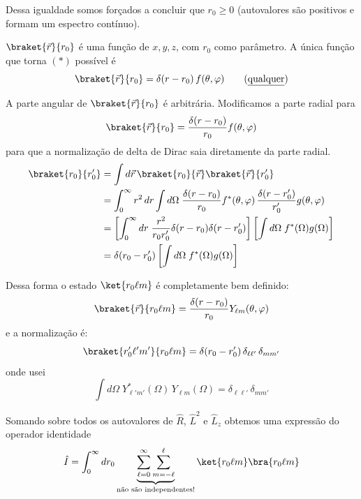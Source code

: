 Dessa igualdade somos forçados a concluir que $r_0 \ge 0$ (autovalores são positivos e formam um espectro contínuo).

$\braket{\vec{r}}{r_0}$ é uma função de $x,y,z$, com $r_0$ como parâmetro. A única função que torna $(*)$ possível é
\begin{equation}
    \braket{\vec{r}}{r_0} = \delta(r-r_0)\,f(\theta,\varphi) \qquad \text{(\underline{qualquer})}
\label{eq:aula22_R_autofuncao}
\end{equation}

A parte angular de $\braket{\vec{r}}{r_0}$ é arbitrária. Modificamos a parte radial para
\begin{equation}
    \braket{\vec{r}}{r_0} = \frac{\delta(r-r_0)}{r_0}f(\theta,\varphi)
\label{eq:aula22_R_autofuncao_modificada}
\end{equation}
para que a normalização de delta de Dirac saia diretamente da parte radial.
\begin{align}
    \braket{r_0}{r_0'} &= \int d\vec{r}\,\braket{r_0}{\vec{r}}\braket{\vec{r}}{r_0'} \notag \\
    &= \int_0^\infty r^2\,dr \int d\Omega \; \frac{\delta(r-r_0)}{r_0}f^*(\theta,\varphi)\,\frac{\delta(r-r_0')}{r_0'}g(\theta,\varphi) \notag \\
    &= \left[\int_0^\infty dr \; \frac{r^2}{r_0 r_0'}\delta(r-r_0)\delta(r-r_0')\right]\left[\int d\Omega \; f^*(\Omega)g(\Omega)\right] \notag \\
    &= \delta(r_0-r_0')\left[\int d\Omega \; f^*(\Omega)g(\Omega)\right]
\label{eq:aula22_R_normalizacao}
\end{align}

Dessa forma o estado $\ket{r_0\ell m}$ é completamente bem definido:
\begin{equation}
    \braket{\vec{r}}{r_0\ell m} = \frac{\delta(r-r_0)}{r_0}Y_{\ell m}(\theta,\varphi)
\label{eq:aula22_r0lm_funcao_onda}
\end{equation}
e a normalização é:
\begin{equation}
    \braket{r_0'\ell'm'}{r_0\ell m} = \delta(r_0-r_0')\,\delta_{\ell\ell'}\,\delta_{mm'}
\label{eq:aula22_r0lm_normalizacao}
\end{equation}
onde usei
\begin{equation}
    \int d\Omega \; Y_{\ell'm'}^*(\Omega)\,Y_{\ell m}(\Omega) = \delta_{\ell\ell'}\,\delta_{mm'}
\label{eq:aula22_ortogonalidade_Ylm}
\end{equation}

Somando sobre todos os autovalores de $\hat{R}$, $\hat{L}^2$ e $\hat{L}_z$ obtemos uma expressão do operador identidade
\begin{equation}
    \hat{I} = \int_0^\infty dr_0 \underbrace{\sum_{\ell=0}^{\infty}\sum_{m=-\ell}^{\ell}}_{\text{não são independentes!}} \ket{r_0\ell m}\bra{r_0\ell m}
\label{eq:aula22_identidade_r0lm}
\end{equation}

